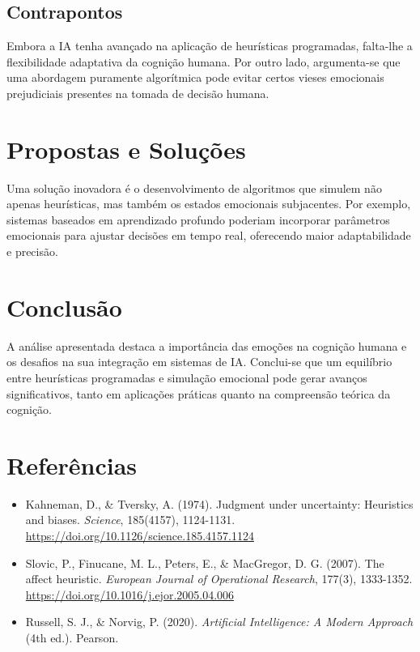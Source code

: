 \documentclass[a4paper,12pt]{report}
\begin{document}
	\subsection*{Contrapontos}
	Embora a IA tenha avançado na aplicação de heurísticas programadas, falta-lhe a flexibilidade adaptativa da cognição humana. Por outro lado, argumenta-se que uma abordagem puramente algorítmica pode evitar certos vieses emocionais prejudiciais presentes na tomada de decisão humana.
	
	\section*{Propostas e Soluções}
	Uma solução inovadora é o desenvolvimento de algoritmos que simulem não apenas heurísticas, mas também os estados emocionais subjacentes. Por exemplo, sistemas baseados em aprendizado profundo poderiam incorporar parâmetros emocionais para ajustar decisões em tempo real, oferecendo maior adaptabilidade e precisão.
	
	\section*{Conclusão}
	A análise apresentada destaca a importância das emoções na cognição humana e os desafios na sua integração em sistemas de IA. Conclui-se que um equilíbrio entre heurísticas programadas e simulação emocional pode gerar avanços significativos, tanto em aplicações práticas quanto na compreensão teórica da cognição.
	
	\section*{Referências}
	\begin{itemize}
		\item Kahneman, D., \& Tversky, A. (1974). Judgment under uncertainty: Heuristics and biases. \textit{Science}, 185(4157), 1124-1131. \url{https://doi.org/10.1126/science.185.4157.1124}
		\item Slovic, P., Finucane, M. L., Peters, E., \& MacGregor, D. G. (2007). The affect heuristic. \textit{European Journal of Operational Research}, 177(3), 1333-1352. \url{https://doi.org/10.1016/j.ejor.2005.04.006}
		\item Russell, S. J., \& Norvig, P. (2020). \textit{Artificial Intelligence: A Modern Approach} (4th ed.). Pearson.
	\end{itemize}
	
\end{document}
